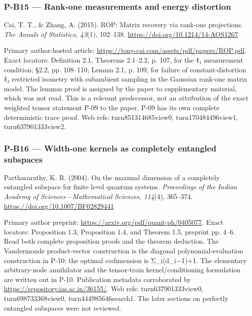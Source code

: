 \documentclass[11pt,a4paper]{article}
\theoremstyle{definition}\newtheorem{definition}{Definition}
\begin{document}
\subsubsection{P-B15 --- Rank-one measurements and energy
distortion}\label{p-b15--rank-one-measurements-and-energy-distortion}

Cai, T. T., \& Zhang, A. (2015). ROP: Matrix recovery via rank-one
projections. \emph{The Annals of Statistics, 43}(1), 102--138.
\url{https://doi.org/10.1214/14-AOS1267}

Primary author-hosted article:
\url{https://tony-cai.com/assets/pdf/papers/ROP.pdf}. Exact locators:
Definition 2.1, Theorems 2.1--2.2, p. 107, for the ℓ₁ measurement
condition; §2.2, pp. 108--110; Lemma 2.1, p. 109, for failure of
constant-distortion ℓ₂ restricted isometry with subambient sampling in
the Gaussian rank-one matrix model. The lemma\textquotesingle s proof is
assigned by the paper to supplementary material, which was not read.
This is a relevant predecessor, not an attribution of the exact weighted
tensor statement P-09 to the paper. P-09 has its own complete
deterministic trace proof. Web refs: turn851314685view0,
turn170484496view1, turn637901333view2.

\subsubsection{P-B16 --- Width-one kernels as completely entangled
subspaces}\label{p-b16--width-one-kernels-as-completely-entangled-subspaces}

Parthasarathy, K. R. (2004). On the maximal dimension of a completely
entangled subspace for finite level quantum systems. \emph{Proceedings
of the Indian Academy of Sciences---Mathematical Sciences, 114}(4),
365--374. \url{https://doi.org/10.1007/BF02829441}

Primary author preprint: \url{https://arxiv.org/pdf/quant-ph/0405077}.
Exact locators: Proposition 1.3, Proposition 1.4, and Theorem 1.5,
preprint pp. 4--6. Read both complete proposition proofs and the theorem
deduction. The Vandermonde product-vector construction is the diagonal
polynomial-evaluation construction in P-10; the optimal codimension is
Σ\_i(d\_i−1)+1. The elementary arbitrary-node annihilator and the
tensor-train kernel/conditioning formulation are written out in P-10.
Publication metadata corroborated by
\url{https://repository.ias.ac.in/36155/}. Web refs: turn637901333view0,
turn698733368view0, turn444985646search1. The later sections on
perfectly entangled subspaces were not reviewed.
\end{document}

